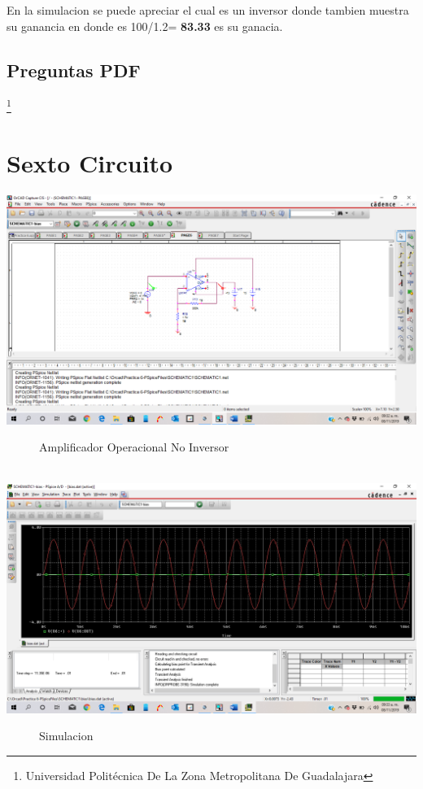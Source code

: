 \documentclass[10pt,a4paper]{article}
\begin{document}
En la simulacion se puede apreciar el cual es un inversor donde tambien muestra su ganancia en donde es 100/1.2= \textbf{83.33} es su ganacia.








\subsection{Preguntas PDF}





\footnote{Universidad Politécnica De La Zona Metropolitana De Guadalajara} 

\newpage

\section{Sexto Circuito}
\begin{center}
 \includegraphics[scale=0.3]{11.png}
 \begin{figure}[hbtp]
 \caption{Amplificador Operacional No Inversor}
 \centering
 \end{figure}\\
  \includegraphics[scale=0.3]{12.png}
 \begin{figure}[hbtp]
 \caption{Simulacion}
 \centering
 \end{figure} 
\end{center}
\end{document}
